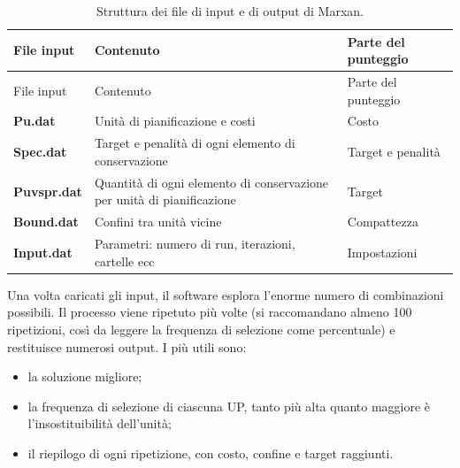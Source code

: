 \documentclass[
  a4paper,
]{book}
\providecommand{\tightlist}{%
  \setlength{\itemsep}{0pt}\setlength{\parskip}{0pt}}
\begin{document}
\begin{longtable}[]{@{}
  >{\raggedright\arraybackslash}p{}
  >{\raggedright\arraybackslash}p{}
  >{\raggedright\arraybackslash}p{}@{}}
\caption{\label{tab:marxanFile} Struttura dei file di input e di output di Marxan.}\tabularnewline
\toprule\noalign{}
\begin{minipage}[b]{\linewidth}\raggedright
File input
\end{minipage} & \begin{minipage}[b]{\linewidth}\raggedright
Contenuto
\end{minipage} & \begin{minipage}[b]{\linewidth}\raggedright
Parte del punteggio
\end{minipage} \\
\midrule\noalign{}
\endfirsthead
\toprule\noalign{}
\begin{minipage}[b]{\linewidth}\raggedright
File input
\end{minipage} & \begin{minipage}[b]{\linewidth}\raggedright
Contenuto
\end{minipage} & \begin{minipage}[b]{\linewidth}\raggedright
Parte del punteggio
\end{minipage} \\
\midrule\noalign{}
\endhead
\bottomrule\noalign{}
\endlastfoot
\textbf{Pu.dat} & Unità di pianificazione e costi & Costo \\
\textbf{Spec.dat} & Target e penalità di ogni elemento di conservazione & Target e penalità \\
\textbf{Puvspr.dat} & Quantità di ogni elemento di conservazione per unità di pianificazione & Target \\
\textbf{Bound.dat} & Confini tra unità vicine & Compattezza \\
\textbf{Input.dat} & Parametri: numero di run, iterazioni, cartelle ecc & Impostazioni \\
\end{longtable}

Una volta caricati gli input, il software esplora l'enorme numero di combinazioni possibili.
Il processo viene ripetuto più volte (si raccomandano almeno 100 ripetizioni, così da leggere la frequenza di selezione come percentuale) e restituisce numerosi output.
I più utili sono:

\begin{itemize}
\tightlist
\item
  la soluzione migliore;
\item
  la frequenza di selezione di ciascuna UP, tanto più alta quanto maggiore è l'insostituibilità dell'unità;
\item
  il riepilogo di ogni ripetizione, con costo, confine e target raggiunti.
\end{itemize}
\end{document}
